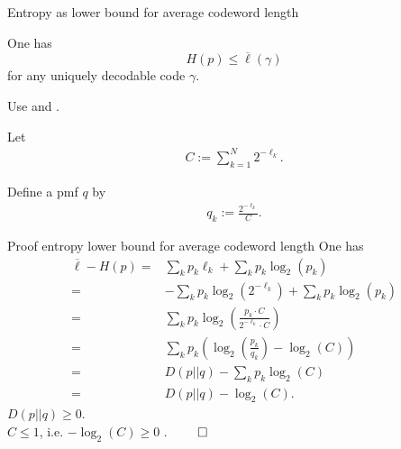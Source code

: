 \begin{frame}{Entropy as lower bound for average codeword length}
\begin{theorem}\label{TheoremEntr}
One has 
\begin{equation*}
\boxed{H(p) \leq \overline{\ell}(\gamma)} 
\end{equation*}
for any uniquely decodable code $\gamma$.
\end{theorem}
\bit
\item Use  and . 
\item Let 
\begin{align*}
C:=\sum_{k=1}^N2^{-\ell_k}.
\end{align*}
\item Define a pmf $q$ by 
\begin{align}\label{DefqEntr}
q_k:=\frac{2^{-\ell_k}}{C}.
\end{align}
\eit
\end{frame}


\begin{frame}{Proof entropy lower bound for average codeword length}
One has
\begin{align*}
\overline{\ell}-H(p)=&\sum_kp_k\ell_k+\sum_kp_k\log_2(p_k)\\
=&-\sum_kp_k\log_2\left(2^{-\ell_k}\right)+\sum_kp_k\log_2(p_k)\\
=&\sum_kp_k\log_2\left(\frac{p_k\cdot C}{2^{-\ell_k}\cdot C}\right)\\
=&\sum_kp_k\left(\log_2\left(\frac{p_k}{q_k}\right)-\log_2(C)\right)\\
=&D(p||q)-\sum_kp_k\log_2(C)\\
=&D(p||q)-\log_2(C).
\end{align*}
 $D(p||q)\geq 0$. \\
 $C\leq 1$, i.e. $-\log_2(C)\geq 0$ .  $\qed$
\end{frame}


